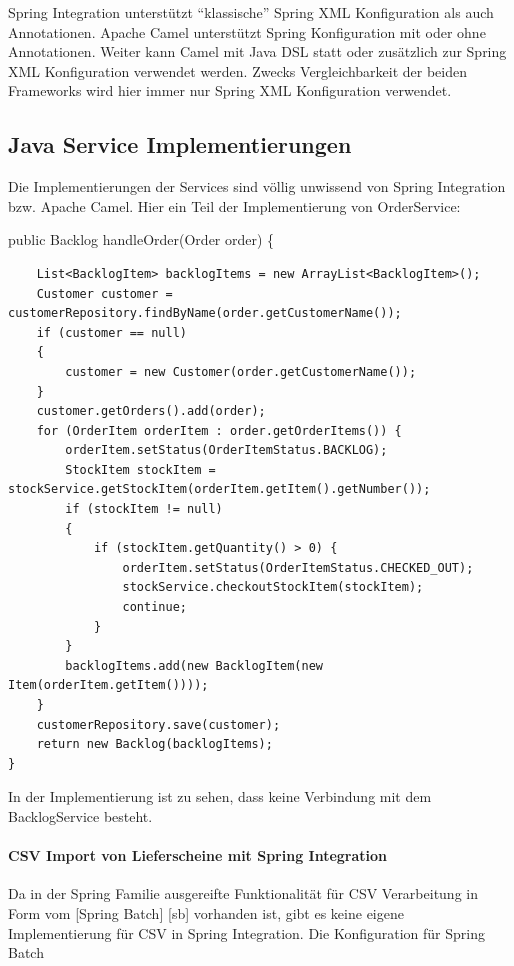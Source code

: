 \documentclass[12pt,a4paper,ngerman]{article}
\begin{document}
Spring Integration unterstützt ``klassische'' Spring XML Konfiguration
als auch Annotationen. Apache Camel unterstützt Spring Konfiguration mit
oder ohne Annotationen. Weiter kann Camel mit Java DSL statt oder
zusätzlich zur Spring XML Konfiguration verwendet werden. Zwecks
Vergleichbarkeit der beiden Frameworks wird hier immer nur Spring XML
Konfiguration verwendet.

\subsection{Java Service Implementierungen}

Die Implementierungen der Services sind völlig unwissend von Spring
Integration bzw. Apache Camel. Hier ein Teil der Implementierung von
OrderService:

public Backlog handleOrder(Order order) \{

\begin{lstlisting}
    List<BacklogItem> backlogItems = new ArrayList<BacklogItem>();
    Customer customer = customerRepository.findByName(order.getCustomerName());
    if (customer == null)
    {
        customer = new Customer(order.getCustomerName());
    }
    customer.getOrders().add(order);
    for (OrderItem orderItem : order.getOrderItems()) {
        orderItem.setStatus(OrderItemStatus.BACKLOG);
        StockItem stockItem = stockService.getStockItem(orderItem.getItem().getNumber());
        if (stockItem != null)
        {
            if (stockItem.getQuantity() > 0) {
                orderItem.setStatus(OrderItemStatus.CHECKED_OUT);
                stockService.checkoutStockItem(stockItem);
                continue;
            }
        }
        backlogItems.add(new BacklogItem(new Item(orderItem.getItem())));
    }
    customerRepository.save(customer);
    return new Backlog(backlogItems);
}
\end{lstlisting}

In der Implementierung ist zu sehen, dass keine Verbindung mit dem
BacklogService besteht.

\paragraph{CSV Import von Lieferscheine mit Spring Integration}

Da in der Spring Familie ausgereifte Funktionalität für CSV Verarbeitung
in Form vom {[}Spring Batch{]} {[}sb{]} vorhanden ist, gibt es keine
eigene Implementierung für CSV in Spring Integration. Die Konfiguration
für Spring Batch
\end{document}
